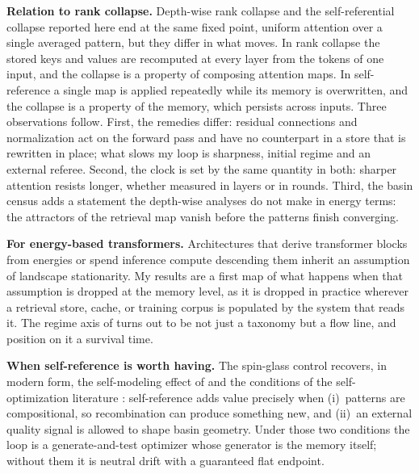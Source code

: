 \documentclass[preprint,12pt,authoryear]{elsarticle}
\begin{document}
\textbf{Relation to rank collapse.} Depth-wise rank collapse
\citep{dong2021, noci2022, geshkovski2025} and the self-referential
collapse reported here end at the same fixed point, uniform attention over
a single averaged pattern, but they differ in what moves. In rank collapse
the stored keys and values are recomputed at every layer from the tokens
of one input, and the collapse is a property of composing attention maps.
In self-reference a single map is applied repeatedly while its memory is
overwritten, and the collapse is a property of the memory, which persists
across inputs. Three observations follow. First, the remedies differ:
residual connections and normalization act on the forward pass
\citep{noci2022, wu2024} and have no counterpart in a store that is
rewritten in place; what slows my loop is sharpness, initial regime and
an external referee. Second, the clock is set by the same quantity in
both: sharper attention resists longer, whether measured in layers or in
rounds. Third, the basin census adds a statement the depth-wise analyses
do not make in energy terms: the attractors of the retrieval map vanish
before the patterns finish converging.

\textbf{For energy-based transformers.} Architectures that derive
transformer blocks from energies \citep{hoover2023} or spend inference
compute descending them \citep{gladstone2025} inherit an assumption of
landscape stationarity. My results are a first map of what happens when
that assumption is dropped at the memory level, as it is dropped in
practice wherever a retrieval store, cache, or training corpus is
populated by the system that reads it. The regime axis of
\citet{ramsauer2021} turns out to be not just a taxonomy but a flow line,
and position on it a survival time.

\textbf{When self-reference is worth having.} The spin-glass control
recovers, in modern form, the self-modeling effect of \citet{watson2011}
and the conditions of the self-optimization literature
\citep{froese2025}: self-reference adds value precisely when (i)~patterns
are compositional, so recombination can produce something new, and
(ii)~an external quality signal is allowed to shape basin geometry. Under
those two conditions the loop is a generate-and-test optimizer whose
generator is the memory itself; without them it is neutral drift with a
guaranteed flat endpoint.
\end{document}
